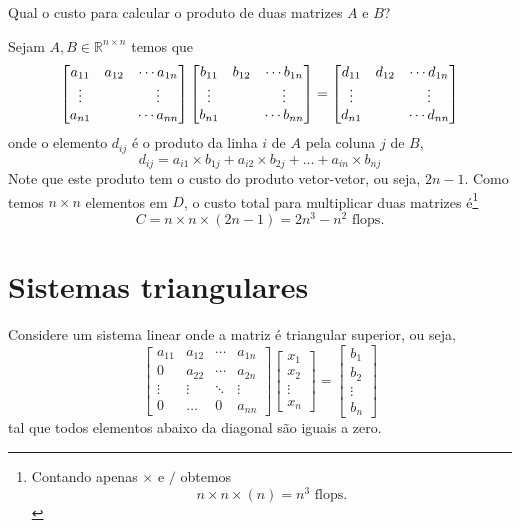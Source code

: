 \begin{ex}
Qual o custo para calcular o produto de duas matrizes  $A$ e $B$?
\end{ex}
\begin{sol}
Sejam $A, B \in \mathbb{R}^{n\times n}$ temos que
\begin{equation}
  \begin{bmatrix} a_{11}&a_{12}&\cdots a_{1n} \\ \vdots&&\vdots \\ a_{n1}&&\cdots a_{nn} \end{bmatrix}
  \begin{bmatrix} b_{11}&b_{12}&\cdots b_{1n} \\ \vdots&&\vdots \\ b_{n1}&&\cdots b_{nn} \end{bmatrix}
 =\begin{bmatrix} d_{11}&d_{12}&\cdots d_{1n} \\ \vdots&&\vdots \\ d_{n1}&&\cdots d_{nn} \end{bmatrix}
\end{equation}
onde o elemento $d_{ij}$ é o produto da linha $i$ de $A$ pela coluna $j$ de $B$,
\begin{equation}
  d_{ij}=  a_{i1}\times b_{1j} + a_{i2}\times b_{2j} +...+a_{in}\times b_{nj}
\end{equation}
Note que este produto tem o custo do produto vetor-vetor, ou seja, $2n-1$. Como temos $n\times n$ elementos em $D$, o custo total para multiplicar duas matrizes é\footnote{Contando apenas $\times$ e $/$ obtemos
\begin{equation}
  n\times n \times(n)  = n^3 \text{~flops.}
\end{equation}
}
\begin{equation}
  C= n\times n \times (2n-1)= 2n^3-n^2 \text{~flops.}
\end{equation}

\end{sol}


\section{Sistemas triangulares}
Considere um sistema linear onde a matriz é triangular superior, ou seja,
\begin{equation}\begin{bmatrix}
a_{11} & a_{12} & \cdots & a_{1n}\\
0      & a_{22} & \cdots & a_{2n}\\
\vdots & \vdots & \ddots & \vdots\\
0      & \dots  & 0     & a_{nn}
\end{bmatrix}
\begin{bmatrix}
x_{1} \\
x_{2} \\
\vdots \\
x_{n}
\end{bmatrix}
 =\begin{bmatrix}
b_{1} \\
b_{2} \\
\vdots \\
b_{n}
\end{bmatrix}
\end{equation}
tal que todos elementos abaixo da diagonal são iguais a zero.

